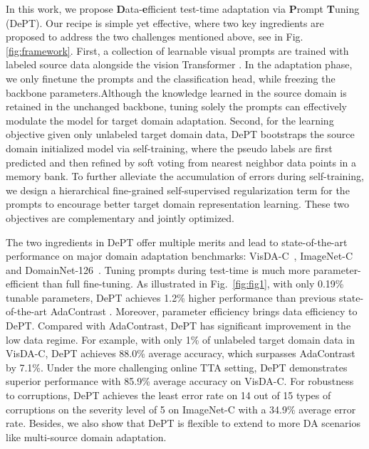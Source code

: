 \documentclass{article} \usepackage{iclr2023_conference,times}
\begin{document}
In this work, we propose \textbf{D}ata-\textbf{e}fficient test-time adaptation via \textbf{P}rompt \textbf{T}uning (DePT). 
Our recipe is simple yet effective, where two key ingredients are proposed to address the two challenges mentioned above, see in Fig. \ref{fig:framework}. First, a collection of learnable visual prompts \citep{jia2022visual} are trained with labeled source data alongside the vision Transformer \citep{dosovitskiy2020image}. In the adaptation phase, we only finetune the prompts and the classification head, while freezing the backbone parameters.Although the knowledge learned in the source domain is retained in the unchanged backbone, tuning solely the prompts can effectively modulate the model for target domain adaptation.
Second, for the learning objective given only unlabeled target domain data, DePT bootstraps the source domain initialized model via self-training, where the pseudo labels are first predicted and then refined by soft voting from nearest neighbor data points in a memory bank. To further alleviate the accumulation of errors during self-training, we design a hierarchical fine-grained self-supervised regularization term for the prompts to encourage better target domain representation learning. These two objectives are complementary and jointly optimized.  

The two ingredients in DePT offer multiple merits and lead to state-of-the-art performance on major domain adaptation benchmarks: VisDA-C~\citep{visda2017}, ImageNet-C~\citep{hendrycks2019benchmarking} and DomainNet-126~\citep{peng2019moment}. Tuning prompts during test-time is much more parameter-efficient than full fine-tuning. As illustrated in Fig.~\ref{fig:fig1}, with only 0.19\% tunable parameters, DePT achieves 1.2\% higher performance than previous state-of-the-art AdaContrast \citep{chen2022contrastive}. Moreover, parameter efficiency brings data efficiency to DePT. Compared with AdaContrast, DePT has significant improvement in the low data regime. For example, with only 1\% of unlabeled target domain data in VisDA-C, DePT achieves 88.0\% average accuracy, which surpasses AdaContrast by 7.1\%. Under the more challenging online TTA setting, DePT demonstrates superior performance with 85.9\% average accuracy on VisDA-C. For robustness to corruptions, DePT achieves the least error rate on 14 out of 15 types of corruptions on the severity level of 5 on ImageNet-C with a 34.9\% average error rate. Besides, we also show that DePT is flexible to extend to more DA scenarios like multi-source \citep{peng2019moment} domain adaptation.
\end{document}
